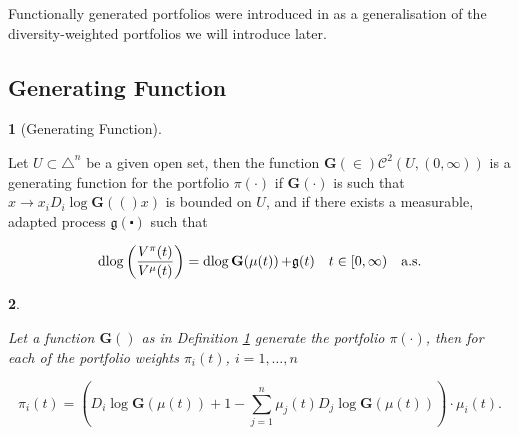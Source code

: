 \documentclass[british]{amsart} \usepackage{lmodern}
\numberwithin{equation}{section} \numberwithin{figure}{section}
\theoremstyle{plain} \newtheorem{thm}{\protect\theoremname}[section]
\theoremstyle{definition} \newtheorem{defn}[thm]{\protect\definitionname}
\theoremstyle{plain} \newtheorem{assumption}[thm]{\protect\assumptionname}
\theoremstyle{plain} \newtheorem{lem}[thm]{\protect\lemmaname}
\theoremstyle{plain} \newtheorem{prop}[thm]{\protect\propositionname}
\theoremstyle{remark} \newtheorem{rem}[thm]{\protect\remarkname}
\theoremstyle{plain} \newtheorem{cor}[thm]{\protect\corollaryname}
\renewcommand{\d}[1]{\mathop{\mathrm{d}{#1}}}
\newcommand{\rangei}{i=1,\dots,n} \newcommand{\measure}{\mathbb{P}}
\begin{document}
Functionally generated portfolios were introduced in \cite{fernholz1999pgf} as a
generalisation of the diversity-weighted portfolios we will introduce later.

\subsection{Generating Function}

\newcommand{\G}[1]{\mathbf{G}(#1)}
\newcommand{\Gmu}{\G{\mu(t)}}
\newcommand{\g}{\mathfrak{g}(t)}

\begin{defn} [Generating Function] 
  \label{def:generatingfunction}

  Let $U \subset \triangle^{n}$ be a given open set, then the function
  $\G\in\mathcal{C}^{2}(U,(0,\infty))$ is a generating function for the
  portfolio $\pi(\cdot)$ if $\G{\cdot}$ is such that $x\to
  x_{i}D_{i}\log\G(x)$ is bounded on $U$, and if there exists a
  measurable, adapted process $\mathfrak{g}(\centerdot)$ such that 

  \begin{equation}
    \d{ \log \left( \frac{V^{\pi}(t)}{V^{\mu}(t)} \right) } = 
    \d{\log{\Gmu}} + \g 
    \quad \ranget
    \quad \almostsurely
  \end{equation}

\end{defn}

\begin{prop} 
  \label{prop:generatingfunction}

  Let a function $\G{}$ as in Definition \ref{def:generatingfunction}
  generate the portfolio $\pi(\cdot)$, then for each of the portfolio weights
  $\pi_{i}(t)$, $\rangei$

  \begin{equation}
    \label{eq:portfoliogeneratedbyG}
    \pi_{i}(t) = 
      \left( 
        D_{i}\log{\Gmu} + 1 - 
          \sum_{j=1}^{n} \mu_{j}(t) D_{j} \log{\Gmu}
      \right) \cdot \mu_{i}(t).
  \end{equation}

\end{prop}
\end{document}
